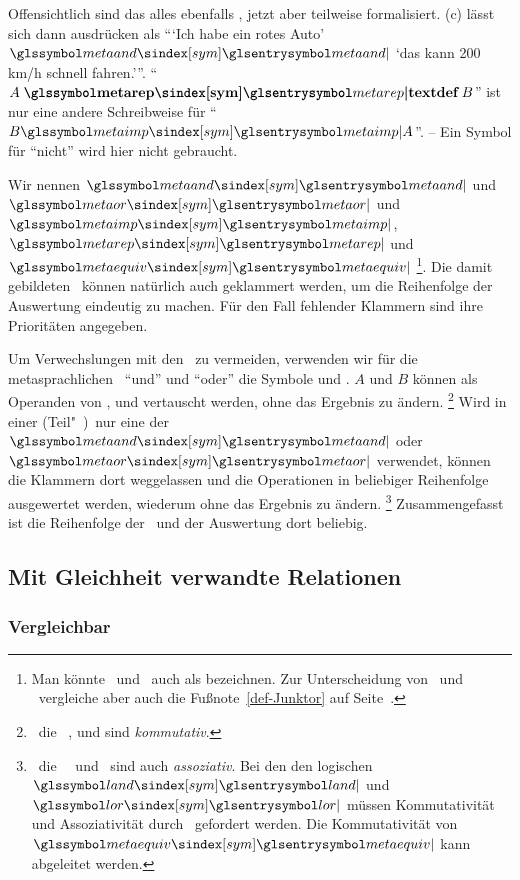 Offensichtlich sind das alles ebenfalls \Aussagen, jetzt aber teilweise formalisiert.
(c) lässt sich dann ausdrücken als \enquote{\enquote{Ich habe ein rotes Auto} $\symmetaand$ \enquote{das kann 200\,km/h schnell fahren.}}.
\enquote{$A \bindefinition{\symmetarep} B$} ist nur eine andere Schreibweise für \enquote{$B \symmetaimp A$}.
-- Ein Symbol für \enquote{nicht} wird hier nicht gebraucht.

Wir nennen $\symmetaand$ und $\symmetaor$  und $\symmetaimp$, $\symmetarep$ und $\symmetaequiv$ %
\footnote{%
	Man könnte \Metaoperationen\ und \Metarelationen\ auch als  bezeichnen. Zur Unterscheidung von \Operationen\ und \Relationen\ vergleiche aber auch die Fußnote~\ref{def-Junktor} auf Seite~\pageref{def-Junktor}.
}.
Die damit gebildeten \Aussagen\ können natürlich auch geklammert werden, um die Reihenfolge der Auswertung eindeutig zu machen.
Für den Fall fehlender Klammern sind ihre Prioritäten  angegeben.

Um Verwechslungen mit den \Junktoren\ zu vermeiden, verwenden wir für die metasprachlichen \Operationen\ \enquote{und} und \enquote{oder} die Symbole \chrqt{\symmetaand} und \chrqt{\symmetaor}.
$A$ und $B$ können als Operanden von \chrqt{\symmetaequiv}, \chrqt{\symmetaand} und \chrqt{\symmetaor} vertauscht werden, ohne das Ergebnis zu ändern.%
\footnote{%
	\textDh\ die \Operationen\ \chrqt{\symmetaequiv}, \chrqt{\symmetaand} und \chrqt{\symmetaor} sind \emph{kommutativ}.
}
Wird in einer (Teil"~)\Aussage\ nur eine der \Operationen\ $\symmetaand$ oder $\symmetaor$ verwendet, können die Klammern dort weggelassen und die Operationen in beliebiger Reihenfolge ausgewertet werden, wiederum ohne das Ergebnis zu ändern.%
\footnote{%
	\textDh\ die \Operationen\ \symmetaand\ und \symmetaor\ sind auch \emph{assoziativ}.
	Bei den den logischen \Operationen\ $\symland$ und $\symlor$ müssen Kommutativität und Assoziativität durch \Axiome\ gefordert werden.
	Die Kommutativität von $\symmetaequiv$ kann abgeleitet werden.
}
Zusammengefasst ist die Reihenfolge der \Operationen\ und der Auswertung dort beliebig.

\subsection{Mit Gleichheit verwandte Relationen}%
\label{sub-Gleichheit}

\subsubsection{Vergleichbar}%
\label{subsub-Vergleichbar}

